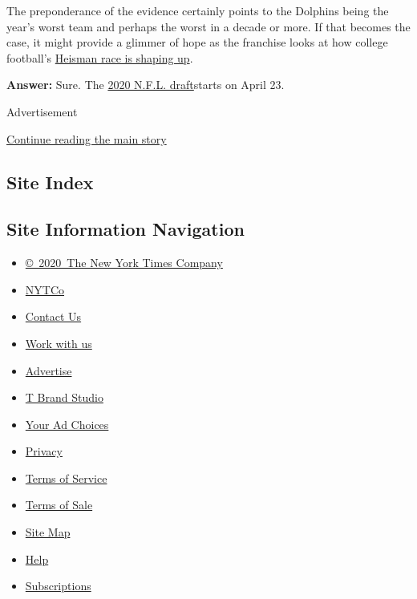 The preponderance of the evidence certainly points to the Dolphins being
the year's worst team and perhaps the worst in a decade or more. If that
becomes the case, it might provide a glimmer of hope as the franchise
looks at how college football's
\href{https://www.nytimes3xbfgragh.onion/2019/10/24/sports/ncaafootball/heisman-trophy-race-odds.html}{Heisman
race is shaping up}.

\textbf{Answer:} Sure. The
\href{http://www.nfl.com/news/story/0ap3000001071017/article/2020-nfl-draft-order-dolphins-no-1-at-midseason-giants-no-6}{2020
N.F.L. draft}starts on April 23.

Advertisement

\protect\hyperlink{after-bottom}{Continue reading the main story}

\hypertarget{site-index}{%
\subsection{Site Index}\label{site-index}}

\hypertarget{site-information-navigation}{%
\subsection{Site Information
Navigation}\label{site-information-navigation}}

\begin{itemize}
\tightlist
\item
  \href{https://help.nytimes3xbfgragh.onion/hc/en-us/articles/115014792127-Copyright-notice}{©~2020~The
  New York Times Company}
\end{itemize}

\begin{itemize}
\tightlist
\item
  \href{https://www.nytco.com/}{NYTCo}
\item
  \href{https://help.nytimes3xbfgragh.onion/hc/en-us/articles/115015385887-Contact-Us}{Contact
  Us}
\item
  \href{https://www.nytco.com/careers/}{Work with us}
\item
  \href{https://nytmediakit.com/}{Advertise}
\item
  \href{http://www.tbrandstudio.com/}{T Brand Studio}
\item
  \href{https://www.nytimes3xbfgragh.onion/privacy/cookie-policy\#how-do-i-manage-trackers}{Your
  Ad Choices}
\item
  \href{https://www.nytimes3xbfgragh.onion/privacy}{Privacy}
\item
  \href{https://help.nytimes3xbfgragh.onion/hc/en-us/articles/115014893428-Terms-of-service}{Terms
  of Service}
\item
  \href{https://help.nytimes3xbfgragh.onion/hc/en-us/articles/115014893968-Terms-of-sale}{Terms
  of Sale}
\item
  \href{https://spiderbites.nytimes3xbfgragh.onion}{Site Map}
\item
  \href{https://help.nytimes3xbfgragh.onion/hc/en-us}{Help}
\item
  \href{https://www.nytimes3xbfgragh.onion/subscription?campaignId=37WXW}{Subscriptions}
\end{itemize}
